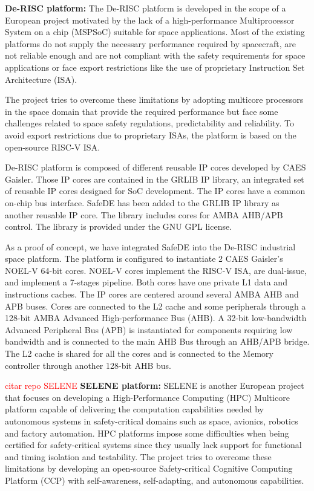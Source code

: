 \textbf{De-RISC platform:} The De-RISC platform \cite{gomez2020risc} is developed in the scope of a European project motivated by the lack of a high-performance Multiprocessor System on a chip (MSPSoC) suitable for space applications. Most of the existing platforms do not supply the necessary performance required by spacecraft, are not reliable enough and are not compliant with the safety requirements for space applications or face export restrictions like the use of proprietary Instruction Set Architecture (ISA). 

The project tries to overcome these limitations by adopting multicore processors in the space domain that provide the required performance but face some challenges related to space safety regulations, predictability and reliability. To avoid export restrictions due to proprietary ISAs, the platform is based on the open-source RISC-V ISA. 

De-RISC platform is composed of different reusable IP cores developed by CAES Gaisler. Those IP cores are contained in the GRLIB IP library, an integrated set of reusable IP cores designed for SoC development. The IP cores have a common on-chip bus interface. SafeDE has been added to the GRLIB IP library as another reusable IP core. The library includes cores for AMBA AHB/APB control. The library is provided under the GNU GPL license.

As a proof of concept, we have integrated SafeDE into the De-RISC industrial space platform. The platform is configured to instantiate 2 CAES Gaisler's NOEL-V 64-bit cores. NOEL-V cores implement the RISC-V ISA, are dual-issue, and implement a 7-stages pipeline. Both cores have one private L1 data and instructions caches. The IP cores are centered around several AMBA AHB and APB buses. Cores are connected to the L2 cache and some peripherals through a 128-bit AMBA Advanced High-performance Bus (AHB). A 32-bit low-bandwidth Advanced Peripheral Bus (APB) is instantiated for components requiring low bandwidth and is connected to the main AHB Bus through an AHB/APB bridge. The L2 cache is shared for all the cores and is connected to the Memory controller through another 128-bit AHB bus.


\textcolor{red}{citar repo SELENE}
\textbf{SELENE platform:} SELENE \cite{SELENEgit} is another European project that focuses on developing a High-Performance Computing (HPC) Multicore platform capable of delivering the computation capabilities needed by autonomous systems in safety-critical domains such as space, avionics, robotics and factory automation. HPC platforms impose some difficulties when being certified for safety-critical systems since they usually lack support for functional and timing isolation and testability. The project tries to overcome these limitations by developing an open-source Safety-critical Cognitive Computing Platform (CCP) with self-awareness, self-adapting, and autonomous capabilities. 

